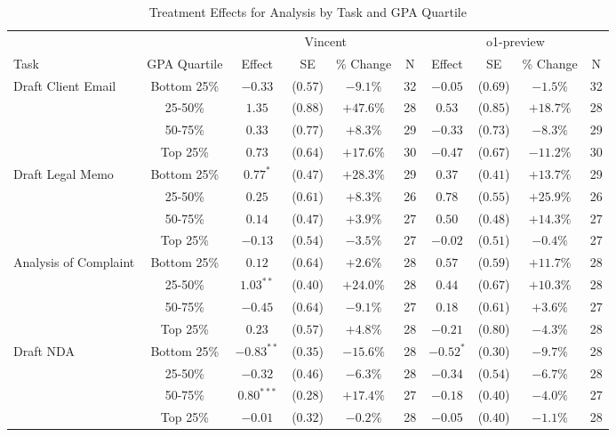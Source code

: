 \begin{table}[!htbp]
\centering
\caption{Treatment Effects for Analysis by Task and GPA Quartile}
\label{tab:analysis_gpa}
\begin{tabular}{lccccccccc}
\hline\hline
& & \multicolumn{4}{c}{Vincent} & \multicolumn{4}{c}{o1-preview} \\
\cline{3-10}
Task & GPA Quartile & Effect & SE & \% Change & N & Effect & SE & \% Change & N \\
\hline
\multirow{4}{*}{Draft Client Email} & Bottom 25\% & $-0.33$ & ($0.57$) & $-9.1\%$ & 32 & $-0.05$ & ($0.69$) & $-1.5\%$ & 32 \\
& 25-50\% & $1.35$ & ($0.88$) & $+47.6\%$ & 28 & $0.53$ & ($0.85$) & $+18.7\%$ & 28 \\
& 50-75\% & $0.33$ & ($0.77$) & $+8.3\%$ & 29 & $-0.33$ & ($0.73$) & $-8.3\%$ & 29 \\
& Top 25\% & $0.73$ & ($0.64$) & $+17.6\%$ & 30 & $-0.47$ & ($0.67$) & $-11.2\%$ & 30 \\
\hline
\multirow{4}{*}{Draft Legal Memo} & Bottom 25\% & $0.77^{*}$ & ($0.47$) & $+28.3\%$ & 29 & $0.37$ & ($0.41$) & $+13.7\%$ & 29 \\
& 25-50\% & $0.25$ & ($0.61$) & $+8.3\%$ & 26 & $0.78$ & ($0.55$) & $+25.9\%$ & 26 \\
& 50-75\% & $0.14$ & ($0.47$) & $+3.9\%$ & 27 & $0.50$ & ($0.48$) & $+14.3\%$ & 27 \\
& Top 25\% & $-0.13$ & ($0.54$) & $-3.5\%$ & 27 & $-0.02$ & ($0.51$) & $-0.4\%$ & 27 \\
\hline
\multirow{4}{*}{Analysis of Complaint} & Bottom 25\% & $0.12$ & ($0.64$) & $+2.6\%$ & 28 & $0.57$ & ($0.59$) & $+11.7\%$ & 28 \\
& 25-50\% & $1.03^{**}$ & ($0.40$) & $+24.0\%$ & 28 & $0.44$ & ($0.67$) & $+10.3\%$ & 28 \\
& 50-75\% & $-0.45$ & ($0.64$) & $-9.1\%$ & 27 & $0.18$ & ($0.61$) & $+3.6\%$ & 27 \\
& Top 25\% & $0.23$ & ($0.57$) & $+4.8\%$ & 28 & $-0.21$ & ($0.80$) & $-4.3\%$ & 28 \\
\hline
\multirow{4}{*}{Draft NDA} & Bottom 25\% & $-0.83^{**}$ & ($0.35$) & $-15.6\%$ & 28 & $-0.52^{*}$ & ($0.30$) & $-9.7\%$ & 28 \\
& 25-50\% & $-0.32$ & ($0.46$) & $-6.3\%$ & 28 & $-0.34$ & ($0.54$) & $-6.7\%$ & 28 \\
& 50-75\% & $0.80^{***}$ & ($0.28$) & $+17.4\%$ & 27 & $-0.18$ & ($0.40$) & $-4.0\%$ & 27 \\
& Top 25\% & $-0.01$ & ($0.32$) & $-0.2\%$ & 28 & $-0.05$ & ($0.40$) & $-1.1\%$ & 28 \\

\end{tabular}
\end{table}
